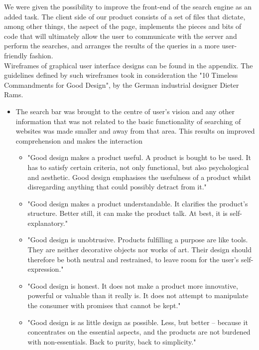 We were given the possibility to improve the front-end of the search engine as an added task. The client side of our product consists of a set of files that dictate, among other things, the aspect of the page, implements the pieces and bits of code that will ultimately allow the user to communicate with the server and perform the searches, and arranges the results of the queries in a more user-friendly fashion.\\
Wireframes of graphical user interface designs can be found in the appendix. The guidelines defined by such wireframes took in consideration the "10 Timeless Commandments for Good Design", by the German industrial designer Dieter Rams. \citep{domingo:designprinciples}
\begin{itemize}
    \item The search bar was brought to the centre of user's vision and any other information that was not related to the basic functionality of searching of websites was made smaller and away from that area. This results on improved comprehension and makes the interaction
    \begin{itemize}
        \item "Good design makes a product useful. A product is bought to be used. It has to satisfy certain criteria, not only functional, but also psychological and aesthetic. Good design emphasises the usefulness of a product whilst disregarding anything that could possibly detract from it." \citep{domingo:designprinciples}
        \item "Good design makes a product understandable. It clarifies the product’s structure. Better still, it can make the product talk. At best, it is self-explanatory." \citep{domingo:designprinciples}
        \item "Good design is unobtrusive. Products fulfilling a purpose are like tools. They are neither decorative objects nor works of art. Their design should therefore be both neutral and restrained, to leave room for the user’s self-expression." \citep{domingo:designprinciples}
        \item "Good design is honest. It does not make a product more innovative, powerful or valuable than it really is. It does not attempt to manipulate the consumer with promises that cannot be kept." \citep{domingo:designprinciples}
        \item "Good design is as little design as possible. Less, but better – because it concentrates on the essential aspects, and the products are not burdened with non-essentials. Back to purity, back to simplicity." \citep{domingo:designprinciples}

\end{itemize}
\end{itemize}
